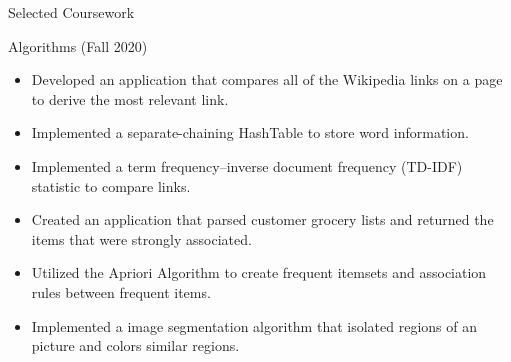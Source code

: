 \documentclass[]{johnsoncv}
\begin{document}
\begin{cvsection}{Selected Coursework}
		

		\begin{cvsubsection}{Algorithms (Fall 2020)}{}{}
			\begin{itemize}  
				\item Developed an application that compares all of the Wikipedia links on a page to derive the most relevant link.
				\item Implemented a separate-chaining HashTable to store word information.
				\item Implemented a term frequency–inverse document frequency (TD-IDF) statistic to compare links.
				\item Created an application that parsed customer grocery lists and returned the items that were strongly associated.
				\item Utilized the Apriori Algorithm to create frequent itemsets and association rules between frequent items. 
				\item Implemented a image segmentation algorithm that isolated regions of an picture and colors similar regions.
			\end{itemize}
		\end{cvsubsection}
	


\end{cvsection}
\end{document}
